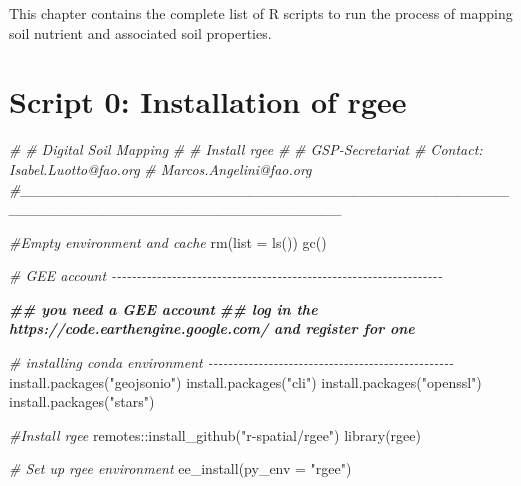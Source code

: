 \documentclass[
  10pt,
  b5paper,
  oneside]{book}
\newenvironment{Shaded}{\begin{snugshade}}{\end{snugshade}}
\newcommand{\AttributeTok}[1]{\textcolor[rgb]{0.77,0.63,0.00}{#1}}
\newcommand{\CommentTok}[1]{\textcolor[rgb]{0.56,0.35,0.01}{\textit{#1}}}
\newcommand{\DocumentationTok}[1]{\textcolor[rgb]{0.56,0.35,0.01}{\textbf{\textit{#1}}}}
\newcommand{\FunctionTok}[1]{\textcolor[rgb]{0.00,0.00,0.00}{#1}}
\newcommand{\NormalTok}[1]{#1}
\newcommand{\SpecialCharTok}[1]{\textcolor[rgb]{0.00,0.00,0.00}{#1}}
\newcommand{\StringTok}[1]{\textcolor[rgb]{0.31,0.60,0.02}{#1}}
\begin{document}
This chapter contains the complete list of R scripts to run the process of mapping soil nutrient and associated soil properties.

\hypertarget{script-0-installation-of-rgee}{%
\section*{Script 0: Installation of rgee}\label{script-0-installation-of-rgee}}

\begin{Shaded}
\begin{Highlighting}[]
\CommentTok{\#}
\CommentTok{\# Digital Soil Mapping}
\CommentTok{\# }
\CommentTok{\# Install rgee}
\CommentTok{\#}
\CommentTok{\# GSP{-}Secretariat}
\CommentTok{\# Contact: Isabel.Luotto@fao.org}
\CommentTok{\#          Marcos.Angelini@fao.org}
\CommentTok{\#\_\_\_\_\_\_\_\_\_\_\_\_\_\_\_\_\_\_\_\_\_\_\_\_\_\_\_\_\_\_\_\_\_\_\_\_\_\_\_\_\_\_\_\_\_\_\_\_\_\_\_\_\_\_\_\_\_\_\_\_\_\_\_\_\_\_\_\_\_\_\_\_\_\_\_\_\_\_\_}

\CommentTok{\#Empty environment and cache }
\FunctionTok{rm}\NormalTok{(}\AttributeTok{list =} \FunctionTok{ls}\NormalTok{())}
\FunctionTok{gc}\NormalTok{()}

\CommentTok{\# GEE account {-}{-}{-}{-}{-}{-}{-}{-}{-}{-}{-}{-}{-}{-}{-}{-}{-}{-}{-}{-}{-}{-}{-}{-}{-}{-}{-}{-}{-}{-}{-}{-}{-}{-}{-}{-}{-}{-}{-}{-}{-}{-}{-}{-}{-}{-}{-}{-}{-}{-}{-}{-}{-}{-}{-}{-}{-}{-}{-}{-}{-}{-}{-}{-}{-}{-}}

\DocumentationTok{\#\# you need a GEE account}
\DocumentationTok{\#\# log in the https://code.earthengine.google.com/ and register for one}


\CommentTok{\# installing conda environment {-}{-}{-}{-}{-}{-}{-}{-}{-}{-}{-}{-}{-}{-}{-}{-}{-}{-}{-}{-}{-}{-}{-}{-}{-}{-}{-}{-}{-}{-}{-}{-}{-}{-}{-}{-}{-}{-}{-}{-}{-}{-}{-}{-}{-}{-}{-}{-}{-}}
\FunctionTok{install.packages}\NormalTok{(}\StringTok{"geojsonio"}\NormalTok{)}
\FunctionTok{install.packages}\NormalTok{(}\StringTok{"cli"}\NormalTok{)}
\FunctionTok{install.packages}\NormalTok{(}\StringTok{"openssl"}\NormalTok{)}
\FunctionTok{install.packages}\NormalTok{(}\StringTok{"stars"}\NormalTok{)}

\CommentTok{\#Install rgee}
\NormalTok{remotes}\SpecialCharTok{::}\FunctionTok{install\_github}\NormalTok{(}\StringTok{"r{-}spatial/rgee"}\NormalTok{)}
\FunctionTok{library}\NormalTok{(rgee)}

\CommentTok{\# Set up rgee environment }
\FunctionTok{ee\_install}\NormalTok{(}\AttributeTok{py\_env =} \StringTok{"rgee"}\NormalTok{) }


\end{Highlighting}
\end{Shaded}
\end{document}
